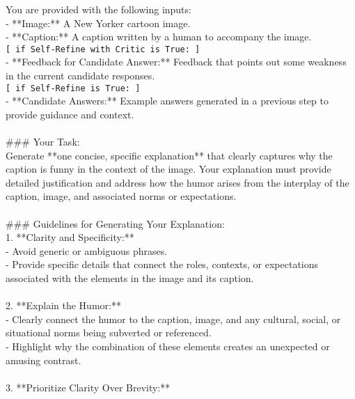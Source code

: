 \begin{figure*}
\small
\begin{tcolorbox}[
    title=Prompt for Baselines,
    colback=white,
    colframe=Black,
    arc=0pt,        %
    outer arc=0pt,  %
]

You are provided with the following inputs:\\
- **\text{[}Image\text{]}:** A New Yorker cartoon image.\\
- **\text{[}Caption\text{]}:** A caption written by a human to accompany the image.\\
\texttt{[ if Self-Refine with Critic is True: ]} \\
- **\text{[}Feedback for Candidate Answer\text{]}:** Feedback that points out some weakness in the current candidate responses.\\
\texttt{[ if Self-Refine is True: ]} \\
- **\text{[}Candidate Answers\text{]}:** Example answers generated in a previous step to provide guidance and context.\\
\\
\#\#\# Your Task:\\
Generate **one concise, specific explanation** that clearly captures why the caption is funny in the context of the image. Your explanation must provide detailed justification and address how the humor arises from the interplay of the caption, image, and associated norms or expectations.\\
\\
\#\#\# Guidelines for Generating Your Explanation:\\
1. **Clarity and Specificity:**  \\
   - Avoid generic or ambiguous phrases.  \\
   - Provide specific details that connect the roles, contexts, or expectations associated with the elements in the image and its caption.  \\
\\
2. **Explain the Humor:**  \\
- Clearly connect the humor to the caption, image, and any cultural, social, or situational norms being subverted or referenced.  \\
- Highlight why the combination of these elements creates an unexpected or amusing contrast.\\
\\
3. **Prioritize Clarity Over Brevity:**  \\

\end{tcolorbox}
\end{figure*}
